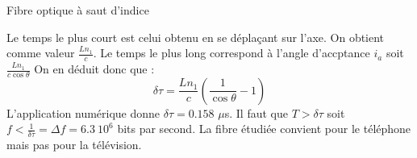 \begin{exo}[PCSI]{Fibre optique à saut d'indice}
\begin{quest}
{Le temps le plus court est celui obtenu en se déplaçant sur l'axe. On obtient comme valeur $\frac{Ln_1}{c}$. Le temps le plus long correspond à l'angle d'accptance $i_a$ soit $\frac{Ln_1}{c\cos\theta}$ On en déduit donc que :
\begin{equation}
\boxed{\delta \tau = \frac{Ln_1}{c}\left(\frac{1}{\cos\theta} -1\right)}
\end{equation}
L'application numérique donne $\delta\tau = 0.158$ $\mu$s.
Il faut que $T > \delta\tau$ soit $f < \frac{1}{\delta\tau} = \Delta f = 6.3\ 10^6$ bits par second. La fibre étudiée convient pour le téléphone mais pas pour la télévision.
}
\end{quest}
\end{exo}


